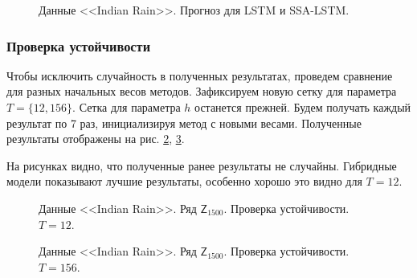 \documentclass[specialist,
               substylefile = spbu.rtx,
               subf,href,colorlinks=true, 12p]{disser}
\begin{document}
\begin{figure}[H]
	\captionsetup{justification=centering}
	\caption{Данные <<Indian Rain>>. Прогноз для LSTM и SSA-LSTM.}
	\label{rain_res_lstm}
\end{figure}

\subsubsection{Проверка устойчивости}

Чтобы исключить случайность в полученных результатах, проведем сравнение для разных начальных весов методов. Зафиксируем новую сетку для параметра $T = \{12, 156\}$. Сетка для параметра $h$ останется прежней. Будем получать каждый результат по 7 раз, инициализируя метод с новыми весами. Полученные результаты отображены на рис. \ref{2.12}, \ref{2.156}.

На рисунках видно, что полученные ранее результаты не случайны. Гибридные модели показывают лучшие результаты, особенно хорошо это видно для $T = 12$.

\begin{figure}[H]
	\captionsetup{justification=centering}
	\caption{Данные <<Indian Rain>>. Ряд $\mathsf{Z}_{1500}$. Проверка устойчивости. $T = 12$.}
	\label{2.12}
\end{figure}

\begin{figure}[H]
	\captionsetup{justification=centering}
	\caption{Данные <<Indian Rain>>. Ряд $\mathsf{Z}_{1500}$. Проверка устойчивости. $T = 156$.}
	\label{2.156}
\end{figure}
\end{document}
